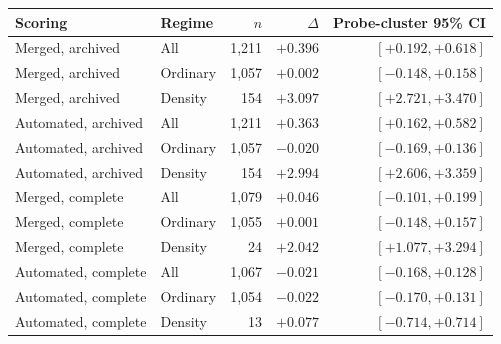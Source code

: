 \begin{tabular}{llrrr}
\toprule
Scoring & Regime & $n$ & $\Delta$ & Probe-cluster 95\% CI \\
\midrule
Merged, archived & All & 1,211 & $+0.396$ & $[+0.192,+0.618]$ \\
Merged, archived & Ordinary & 1,057 & $+0.002$ & $[-0.148,+0.158]$ \\
Merged, archived & Density & 154 & $+3.097$ & $[+2.721,+3.470]$ \\
Automated, archived & All & 1,211 & $+0.363$ & $[+0.162,+0.582]$ \\
Automated, archived & Ordinary & 1,057 & $-0.020$ & $[-0.169,+0.136]$ \\
Automated, archived & Density & 154 & $+2.994$ & $[+2.606,+3.359]$ \\
Merged, complete & All & 1,079 & $+0.046$ & $[-0.101,+0.199]$ \\
Merged, complete & Ordinary & 1,055 & $+0.001$ & $[-0.148,+0.157]$ \\
Merged, complete & Density & 24 & $+2.042$ & $[+1.077,+3.294]$ \\
Automated, complete & All & 1,067 & $-0.021$ & $[-0.168,+0.128]$ \\
Automated, complete & Ordinary & 1,054 & $-0.022$ & $[-0.170,+0.131]$ \\
Automated, complete & Density & 13 & $+0.077$ & $[-0.714,+0.714]$ \\
\bottomrule
\end{tabular}
